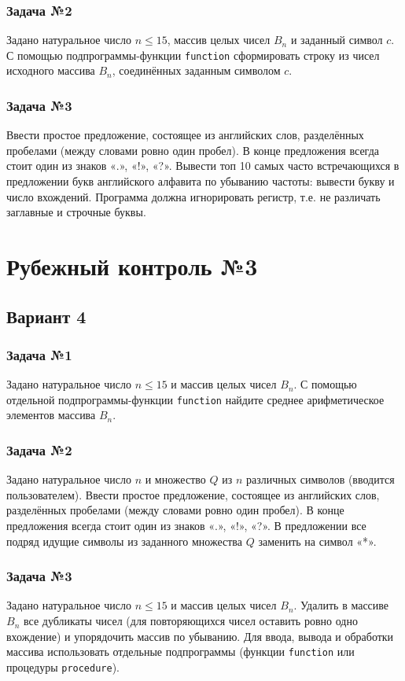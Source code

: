 \documentclass[12pt,a5paper,landscape]{report}
\begin{document}
\subsubsection*{Задача №2}
Задано натуральное число $n \le 15$, массив целых чисел $B_n$ и заданный символ $c$. С помощью подпрограммы-функции \texttt{function} сформировать строку из чисел исходного массива $B_n$, соединённых заданным символом $c$.
\subsubsection*{Задача №3}
Ввести простое предложение, состоящее из английских слов, разделённых пробелами (между словами ровно один пробел). В конце предложения всегда стоит один из знаков «.», «!», «?». Вывести топ 10 самых часто встречающихся в предложении букв английского алфавита по убыванию частоты: вывести букву и число вхождений. Программа должна игнорировать регистр, т.е. не различать заглавные и строчные буквы.

\section*{Рубежный контроль №3}
\subsection*{Вариант 4}
\subsubsection*{Задача №1}
Задано натуральное число $n \le 15$ и массив целых чисел $B_n$. С помощью отдельной подпрограммы-функции \texttt{function} найдите среднее арифметическое элементов массива $B_n$.
\subsubsection*{Задача №2}
Задано натуральное число $n$ и множество $Q$ из $n$ различных символов (вводится пользователем). Ввести простое предложение, состоящее из английских слов, разделённых пробелами (между словами ровно один пробел). В конце предложения всегда стоит один из знаков «.», «!», «?». В предложении все подряд идущие символы из заданного множества $Q$ заменить на символ «*».
\subsubsection*{Задача №3}
Задано натуральное число $n \le 15$ и массив целых чисел $B_n$. Удалить в массиве $B_n$ все дубликаты чисел (для повторяющихся чисел оставить ровно одно вхождение) и упорядочить массив по убыванию. Для ввода, вывода и обработки массива использовать отдельные подпрограммы (функции \texttt{function} или процедуры \texttt{procedure}).
\end{document}
